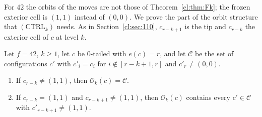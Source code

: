 For $42$ the orbits of the moves are not those of Theorem~\ref{cl:thm:Fk}; the frozen exterior cell is $(1,1)$ instead of $(0,0)$. We prove the part of the orbit structure that $(\mathrm{CTRL}_k)$ needs. As in Section~\ref{cl:sec:110}, $c_{r-k+1}$ is the tip and $c_{r-k}$ the exterior cell of $c$ at level $k$.

\begin{theorem}\label{cl:thm:Fk42}
Let $f=42$, $k\ge1$, let $c$ be $0$-tailed with $e(c)=r$, and let $\mathcal C$ be the set of configurations $c'$ with $c'_i=c_i$ for $i\notin[r-k+1,r]$ and $c'_r\ne(0,0)$.
\begin{enumerate}
\item[(A)] If $c_{r-k}\ne(1,1)$, then $\mathcal O_k(c)=\mathcal C$.
\item[(B)] If $c_{r-k}=(1,1)$ and $c_{r-k+1}\ne(1,1)$, then $\mathcal O_k(c)$ contains every $c'\in\mathcal C$ with $c'_{r-k+1}\ne(1,1)$.
\end{enumerate}
\end{theorem}

